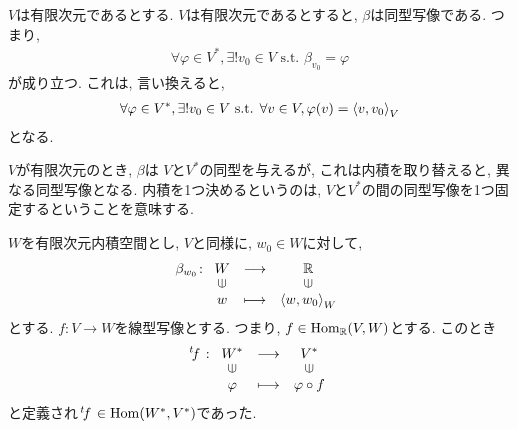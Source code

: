   $V$は有限次元であるとする.
  $V$は有限次元であるとすると,
  $\beta$は同型写像である.
  つまり,
  \begin{align*}
    \forall \varphi \in V^\ast,
    \exists ! v_0 \in V \text{ s.t. }
    \beta_{v_0} = \varphi
  \end{align*}
  が成り立つ.
  これは, 言い換えると,
  \begin{align*}
    \forall \varphi \in V^\ast,
    \exists ! v_0 \in V \text{ s.t. }
    \forall v\in V, \varphi(v)=\Braket{v,v_0}_V
  \end{align*}
  となる.

\begin{remark}
  $V$が有限次元のとき,
  $\beta$は
  $V$と$V^\ast$の同型を与えるが,
  これは内積を取り替えると,
  異なる同型写像となる.
  内積を1つ決めるというのは,
  $V$と$V^\ast$の間の同型写像を1つ固定するということを意味する.
\end{remark}

$W$を有限次元内積空間とし,
$V$と同様に,
$w_0\in W$に対して,
\begin{align*}
  \beta_{w_0}\colon
  \Shazo{W}{\RR}
        {w}{\Braket{w,w_0}_W}
\end{align*}
とする.
$f\colon V\to W$を線型写像とする.
つまり, $f\in \operatorname{Hom}_{\mathbb{R}}(V,W)$とする.
このとき
\begin{align*}
  \transposed{f}\colon
  \Shazo{W^\ast}{V^\ast}
        {\varphi}{\varphi\circ f}
\end{align*}
と定義され$\left.^{t}\!f\right.\in \operatorname{Hom}(W^\ast,V^\ast)$であった.

